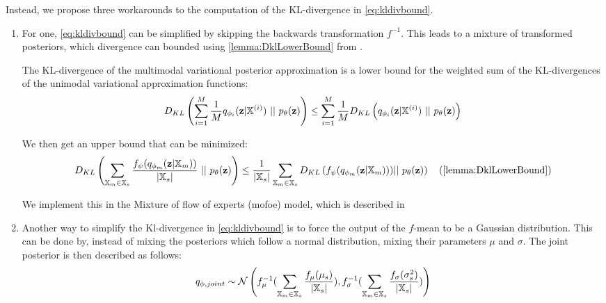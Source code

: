 Instead, we propose three workarounds to the computation of the KL-divergence in \cref{eq:kldivbound}.
\begin{enumerate}

    \item For one, \cref{eq:kldivbound} can be simplified by skipping the backwards transformation $f^{-1}$.
    This leads to a mixture of transformed posteriors, which divergence can bounded using \cref{lemma:DklLowerBound} from \parencite{sutter_multimodal_2020}.
    \begin{lemma}
        \label{lemma:DklLowerBound}

        The KL-divergence of the multimodal variational posterior approximation is a lower bound for the weighted sum of the KL-divergences of the unimodal variational approximation functions:
        \begin{equation}
            D_{KL} \left( \sum _{i=1} ^M \frac{1}{M}q_{\phi_i}(\textbf{z}|\mathbb{X}^{(i)})\ ||\ p_{\theta}(\textbf{z}) \right) \leq \sum _{i=1} ^M \frac{1}{M} D_{KL} \left( q_{\phi_i}(\textbf{z}|\mathbb{X}^{(i)})\ ||\ p_{\theta}(\textbf{z}) \right)
        \end{equation}
    \end{lemma}
    We then get an upper bound that can be minimized:
    \begin{equation}
        D_{KL}\left(\sum _{\xsetm \in \xsubset} \frac{f_{\psi}(\unimodalpost)}{|\xsubset|}\ ||\ \prior\right) \leq \frac{1}{|\xsubset|} \sum  _{\xsetm \in \xsubset} D_{KL} \left(f_{\psi} (\unimodalpost))||\ \prior \right) \quad (\cref{lemma:DklLowerBound})
    \end{equation}

    We implement this in the Mixture of flow of experts (mofoe) model, which is described in %


    \item Another way to simplify the Kl-divergence in \cref{eq:kldivbound} is to force the output of the $f$-mean to be a Gaussian distribution.
    This can be done by, instead of mixing the posteriors which follow a normal distribution, mixing their parameters $\mu$ and $\sigma$.
    The joint posterior is then described as follows:
    \begin{equation}
        q_{\phi, joint} \sim \mathcal{N}\left(  f_{\mu}^{-1}(\sum _{\mathbb{X}_m \in \mathbb{X}_s} \frac{f_{\mu}(\mu_s)}{|\mathbb{X}_s|}),f_{\sigma}^{-1}(\sum  _{\mathbb{X}_m \in \mathbb{X}_s} \frac{f_{\sigma}(\sigma_s^2)}{|\mathbb{X}_s|})\right)
    \end{equation}


\end{enumerate}
